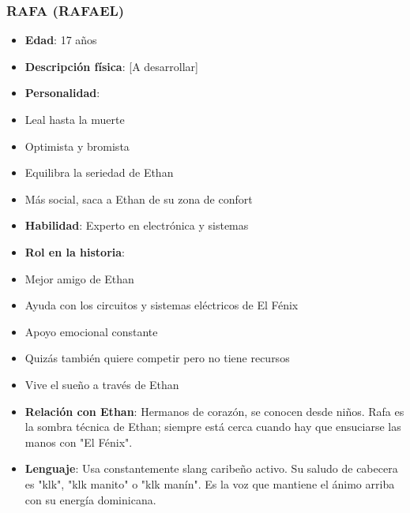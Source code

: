 \documentclass[11pt,a4paper]{report}
\begin{document}
\subsubsection{RAFA (RAFAEL)}
\begin{itemize}
  \item \textbf{Edad}: 17 años
  \item \textbf{Descripción física}: [A desarrollar]
  \item \textbf{Personalidad}: 
  \item Leal hasta la muerte
  \item Optimista y bromista
  \item Equilibra la seriedad de Ethan
  \item Más social, saca a Ethan de su zona de confort
  \item \textbf{Habilidad}: Experto en electrónica y sistemas
  \item \textbf{Rol en la historia}: 
  \item Mejor amigo de Ethan
  \item Ayuda con los circuitos y sistemas eléctricos de El Fénix
  \item Apoyo emocional constante
  \item Quizás también quiere competir pero no tiene recursos
  \item Vive el sueño a través de Ethan
  \item \textbf{Relación con Ethan}: Hermanos de corazón, se conocen desde niños. Rafa es la sombra técnica de Ethan; siempre está cerca cuando hay que ensuciarse las manos con "El Fénix".
  \item \textbf{Lenguaje}: Usa constantemente slang caribeño activo. Su saludo de cabecera es "klk", "klk manito" o "klk manín". Es la voz que mantiene el ánimo arriba con su energía dominicana.

\end{itemize}
\end{document}
